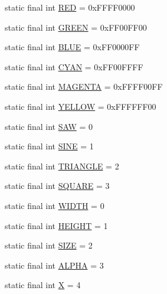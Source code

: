 \begin{DoxyCompactItemize}
static final int \hyperlink{interfacehype_1_1util_1_1_h_constants_a6960c9f468d2db04134257620c5039d8}{R\-E\-D} = 0x\-F\-F\-F\-F0000
\item 
static final int \hyperlink{interfacehype_1_1util_1_1_h_constants_ac52c8cc0389c65df0da774a31a7a4b65}{G\-R\-E\-E\-N} = 0x\-F\-F00\-F\-F00
\item 
static final int \hyperlink{interfacehype_1_1util_1_1_h_constants_a8e3e7eff5775edf54e61a1d5b945f733}{B\-L\-U\-E} = 0x\-F\-F0000\-F\-F
\item 
static final int \hyperlink{interfacehype_1_1util_1_1_h_constants_a1ee6482f8956a1b49605385cd8357cf5}{C\-Y\-A\-N} = 0x\-F\-F00\-F\-F\-F\-F
\item 
static final int \hyperlink{interfacehype_1_1util_1_1_h_constants_a037ad062df07f9d6f41022a0931f1a4c}{M\-A\-G\-E\-N\-T\-A} = 0x\-F\-F\-F\-F00\-F\-F
\item 
static final int \hyperlink{interfacehype_1_1util_1_1_h_constants_afcc8e6a8df20855af26d4102a4676e93}{Y\-E\-L\-L\-O\-W} = 0x\-F\-F\-F\-F\-F\-F00
\item 
static final int \hyperlink{interfacehype_1_1util_1_1_h_constants_aae5e24bdf79b1cce509c726a3284f5d8}{S\-A\-W} = 0
\item 
static final int \hyperlink{interfacehype_1_1util_1_1_h_constants_a0740b2d810a6c3628104772a54286e89}{S\-I\-N\-E} = 1
\item 
static final int \hyperlink{interfacehype_1_1util_1_1_h_constants_aa35b6075af6d8179292288d54c49d318}{T\-R\-I\-A\-N\-G\-L\-E} = 2
\item 
static final int \hyperlink{interfacehype_1_1util_1_1_h_constants_a204671142e318330e1212b0a3398baea}{S\-Q\-U\-A\-R\-E} = 3
\item 
static final int \hyperlink{interfacehype_1_1util_1_1_h_constants_ab7b4a41660845c816b13511eaec79e4b}{W\-I\-D\-T\-H} = 0
\item 
static final int \hyperlink{interfacehype_1_1util_1_1_h_constants_afececab53813d38d020229f635f1869b}{H\-E\-I\-G\-H\-T} = 1
\item 
static final int \hyperlink{interfacehype_1_1util_1_1_h_constants_a6ca8d71d98cc694c355b282997b34396}{S\-I\-Z\-E} = 2
\item 
static final int \hyperlink{interfacehype_1_1util_1_1_h_constants_aef5b6486d6d20db3f27d1229918f42a5}{A\-L\-P\-H\-A} = 3
\item 
static final int \hyperlink{interfacehype_1_1util_1_1_h_constants_aad002b8922a9db0a55d3a88b77068354}{X} = 4
\item 

\end{DoxyCompactItemize}
